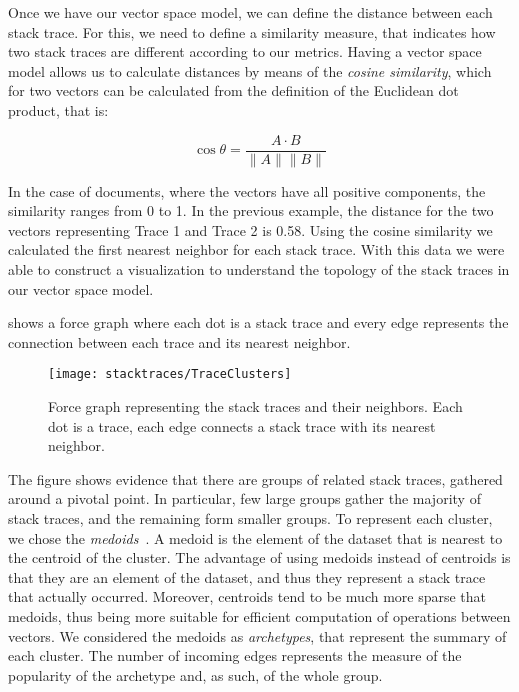 Once we have our vector space model, we can define the distance between each stack trace.
For this, we need to define a similarity measure, that indicates how two stack traces are different according to our metrics.
Having a vector space model allows us to calculate distances by means of the \emph{cosine similarity}, which for two vectors can be calculated from the definition of the Euclidean dot product, that is:

\begin{displaymath}
    \cos\theta=\frac{A \cdot B}{\|A\|\|B\|}
\end{displaymath}

In the case of documents, where the vectors have all positive components, the similarity ranges from 0 to 1.
In the previous example, the distance for the two vectors representing Trace 1 and Trace 2 is 0.58.
Using the cosine similarity we calculated the first nearest neighbor for each stack trace.
With this data we were able to construct a visualization to understand the topology of the stack traces in our vector space model.

 shows a force graph where each dot is a stack trace and every edge represents the connection between each trace and its nearest neighbor.

\begin{figure}[h!t]
\centering
  \texttt{[image: stacktraces/TraceClusters]}
  \caption[Force graph representing the stack traces and their neighbors]{Force graph representing the stack traces and their neighbors.
  Each dot is a trace, each edge connects a stack trace with its nearest neighbor.}
  \label{fig:eva-clusters}
\end{figure}

The figure shows evidence that there are groups of related stack traces, gathered around a pivotal point.
In particular, few large groups gather the majority of stack traces, and the remaining form smaller groups.
To represent each cluster, we chose the \emph{medoids}~\cite{Kauf1987}.
A medoid is the element of the dataset that is nearest to the centroid of the cluster.
The advantage of using medoids instead of centroids is that they are an element of the dataset, and thus they represent a stack trace that actually occurred.
Moreover, centroids tend to be much more sparse that medoids, thus being more suitable for efficient computation of operations between vectors.
We considered the medoids as \emph{archetypes}, that represent the summary of each cluster.
The number of incoming edges represents the measure of the popularity of the archetype and, as such, of the whole group.


